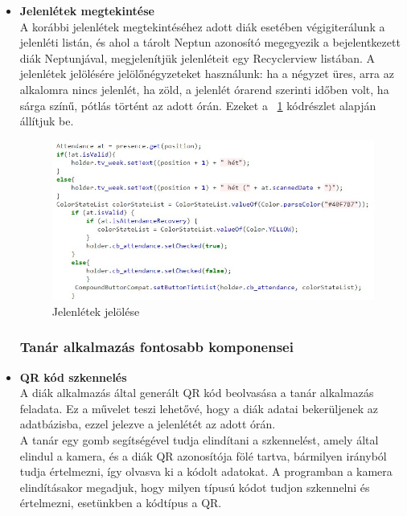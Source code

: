 \documentclass[12pt]{article}
\numberwithin{figure}{section}
\numberwithin{equation}{section}
\begin{document}
\begin{itemize}
\hfill \break

	
\item \textbf{Jelenlétek megtekintése}\\
	A korábbi jelenlétek megtekintéséhez adott diák esetében végigiterálunk a jelenléti listán, és ahol a tárolt Neptun azonosító megegyezik a bejelentkezett diák Neptunjával, megjelenítjük jelenléteit egy Recyclerview listában. A jelenlétek jelölésére jelölőnégyzeteket használunk: ha a négyzet üres, arra az alkalomra nincs jelenlét, ha zöld, a jelenlét órarend szerinti időben volt, ha sárga színű, pótlás történt az adott órán. Ezeket a ~\ref{fig:view_attendance} kódrészlet alapján állítjuk be.\\

	\begin{figure}[H]
		\centering
		\includegraphics[width=400px]{view_att_stud.jpg}
		\caption{Jelenlétek jelölése}
		\label{fig:view_attendance}
	\end{figure}

\hfill \break


\subsubsection{Tanár alkalmazás fontosabb komponensei}

	\item \textbf{QR kód szkennelés}\\
	A diák alkalmazás által generált QR kód beolvasása a tanár alkalmazás feladata. Ez a művelet teszi lehetővé, hogy a diák adatai bekerüljenek az adatbázisba, ezzel jelezve a jelenlétét az adott órán.\\
	A tanár egy gomb segítségével tudja elindítani a szkennelést, amely által elindul a kamera, és a diák QR azonosítója fölé tartva, bármilyen irányból tudja értelmezni, így olvasva ki a kódolt adatokat. A programban a kamera elindításakor megadjuk, hogy milyen típusú kódot tudjon szkennelni és értelmezni, esetünkben a kódtípus a QR.\\
	

\end{itemize}
\end{document}
